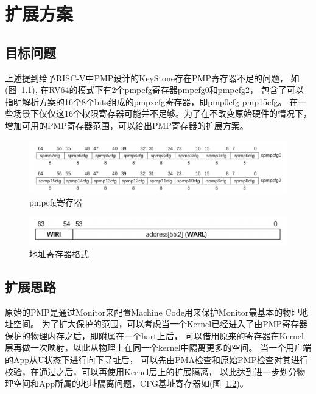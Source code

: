 \label{Chapter5} %
\chapter{扩展方案} %
\section{目标问题}
上述提到给予RISC-V中PMP设计的KeyStone存在PMP寄存器不足的问题，
如(图~\ref{fig:pmpcfg}), 在RV64的模式下有2个pmpcfg寄存器pmpcfg0和pmpcfg2，
包含了可以指明解析方案的16个8个bits组成的pmpxcfg寄存器，即pmp0cfg-pmp15cfg。
在一些场景下仅仅这16个权限寄存器可能并不足够。为了在不改变原始硬件的情况下，
增加可用的PMP寄存器范围，可以给出PMP寄存器的扩展方案。

\begin{figure}
    \centering
    \includegraphics[scale=0.30]{Figures/extend/pmpcfg.png}
    \decoRule
    \caption{pmpcfg寄存器}
    \label{fig:pmpcfg}
\end{figure}

\begin{figure}
    \centering
    \includegraphics[scale=0.30]{Figures/extend/addrformat.png}
    \decoRule
    \caption{地址寄存器格式}
    \label{fig:addrformat}
\end{figure}

\section{扩展思路}
原始的PMP是通过Monitor来配置Machine Code用来保护Monitor最基本的物理地址空间。
为了扩大保护的范围，可以考虑当一个Kernel已经进入了由PMP寄存器保护的物理内存之后，即附属在一个hart上后，
可以借用原来的寄存器在Kernel层再做一次映射，以此从物理上在同一个kernel中隔离更多的空间。
当一个用户端的App从U状态下进行向下寻址后，
可以先由PMA检查和原始PMP检查对其进行校验，在通过之后，可以再使用Kernel层上的扩展隔离，
以此达到进一步划分物理空间和App所属的地址隔离问题，CFG基址寄存器如(图~\ref{fig:addrformat})。

